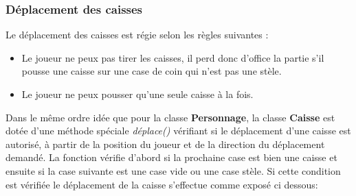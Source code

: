 \documentclass{article}
\begin{document}
		\subsubsection{Déplacement des caisses}
Le déplacement des caisses est régie selon les règles suivantes : 
\begin{itemize}
\item Le joueur ne peux pas tirer les caisses, il perd donc d'office la partie s'il pousse une caisse sur une case de coin qui n'est pas une stèle.
\item Le joueur ne peux pousser qu'une seule caisse à la fois.
\end{itemize}		
Dans le même ordre idée que pour la classe \textbf{Personnage}, la classe \textbf{Caisse} est dotée d'une méthode spéciale \textit{déplace()} vérifiant si le déplacement d'une caisse est autorisé, à partir de la position du joueur et de la direction du déplacement demandé. La fonction vérifie d'abord si la prochaine case est bien une caisse et ensuite si la case suivante est une case vide ou une case stèle. Si cette condition est vérifiée le déplacement de la caisse s'effectue comme exposé ci dessous:
\end{document}
